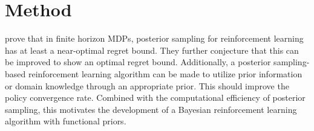 \documentclass[]{uai2021} %
\newcommand{\R}{\mathbb{R}}
\newcommand{\E}{\mathbb{E}}
\newcommand{\N}{\mathbb{N}}
\newcommand{\X}{\mathbf{X}}
\newcommand{\f}{\mathbf{f}}
\newcommand{\state}{\mathcal{S}}
\newcommand{\action}{\mathcal{A}}
\newcommand{\KL}{\mathrm{KL}}
\begin{document}





\section{Method}

\citet{osband_why_2017} prove that in finite horizon MDPs, posterior sampling for
reinforcement learning has at least a near-optimal regret bound. They further conjecture
that this can be improved to show an optimal regret bound. Additionally,
a posterior sampling-based reinforcement learning algorithm can be made to utilize
prior information or domain knowledge through an appropriate prior. This should improve
the policy convergence rate.
Combined with the computational efficiency of posterior sampling, this motivates the
development of a Bayesian reinforcement learning algorithm with functional priors.
\end{document}

